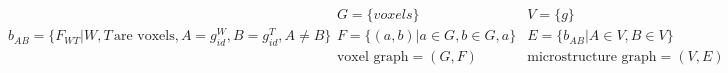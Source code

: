 \begin{subequations}

\begin{equation}
b_{AB}=\{F_{WT} | W, T\, \text{are voxels}, A = g^W_{id}, B = g^T_{id}, A \neq B\}
\label{eq:gbdef}
\end{equation}

\begin{equation}
\begin{aligned}
G=\{voxels\} \\
F=\{(a, b) | a \in G, b \in G, a\} \\
\text{voxel graph} = (G, F)
\end{aligned}
\label{eq:voxelgraph}
\end{equation}

\begin{equation}
\begin{aligned}
V=\{g\} \\
E=\{b_{AB} | A \in V, B \in V\} \\
\text{microstructure graph} = (V, E)
\end{aligned}
\label{eq:micrograph}
\end{equation}

\end{subequations}